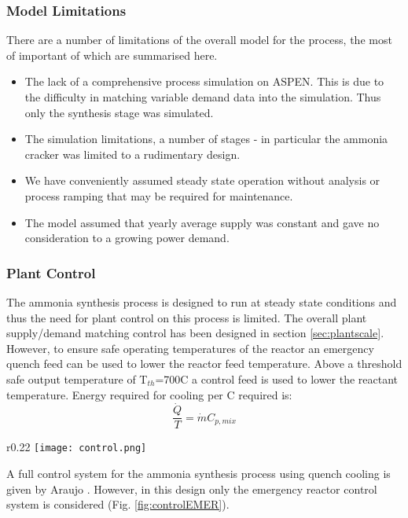 \subsubsection{Model Limitations}
There are a number of limitations of the overall model for the process, the most of important of which are summarised here. 
\begin{itemize}
	\item The lack of a comprehensive process simulation on ASPEN. This is due to the difficulty in matching variable demand data into the simulation. Thus only the synthesis stage was simulated. 
\item The simulation limitations, a number of stages - in particular the ammonia cracker was limited to a rudimentary design. 
\item We have conveniently assumed steady state operation without analysis or process ramping that may be required for maintenance. 
\item The model assumed that yearly average supply was constant and gave no consideration to a growing power demand. 
\end{itemize}
\subsubsection{Plant Control}


The ammonia synthesis process is designed to run at steady state conditions and thus the need for plant control on this process is limited. The overall plant supply/demand matching control has been designed in section \ref{sec:plantscale}. However, to ensure safe operating temperatures of the reactor an emergency quench feed can be used to lower the reactor feed temperature. Above a threshold safe output temperature of T$_{th}$=700\textdegree C a control feed is used to lower the reactant temperature. Energy required for cooling per \textdegree C required is:
\begin{equation}
\frac{\dot{Q}}{T} = \dot{m}C_{p,mix}
\end{equation}

\begin{wrapfigure}{r}{0.22\textwidth}
		\texttt{[image: control.png]}
		\caption{Reactor emergency control \label{fig:controlEMER}}
\end{wrapfigure}
A full control system for the ammonia synthesis process using quench cooling is given by Araujo \cite{Araujo2008}. However, in this design only the emergency reactor control system is considered (Fig. \ref{fig:controlEMER}). 


